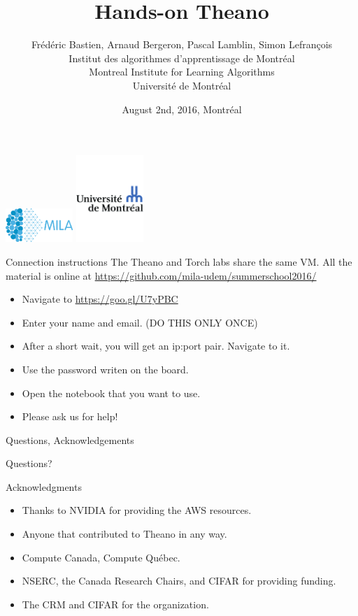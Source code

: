 \documentclass[a4paper,9pt]{beamer}
\title[Labs]{Hands-on Theano}
\author[MILA]{%
Frédéric Bastien, Arnaud Bergeron, Pascal Lamblin, Simon Lefrançois \\
Institut des algorithmes d'apprentissage de Montréal\\
Montreal Institute for Learning Algorithms\\
Université de Montréal}
\date{%
August 2nd, 2016, Montréal
}
\begin{document}
\begin{frame}[plain]
  \titlepage
  \includegraphics[width=1in]{MILA_official_2016.png}
  \hfill
  \includegraphics[width=1in]{UdeM_logo.pdf}
\end{frame}


\begin{frame}{Connection instructions}
  The Theano and Torch labs share the same VM.
  All the material is online at
  \url{https://github.com/mila-udem/summerschool2016/}

  \begin{itemize}
    \item Navigate to \url{https://goo.gl/U7yPBC}
    \item Enter your name and email. (DO THIS ONLY ONCE)
    \item After a short wait, you will get an ip:port pair. Navigate to it.
    \item Use the password writen on the board.
    \item Open the notebook that you want to use.
    \item Please ask us for help!
  \end{itemize}

\end{frame}


\begin{frame}{Questions, Acknowledgements}
\huge
\begin{center}
Questions?
\end{center}
\Large
Acknowledgments
\normalsize
\begin{itemize}
\item Thanks to NVIDIA for providing the AWS resources.
\item Anyone that contributed to Theano in any way.
\item Compute Canada, Compute Québec.
\item NSERC, the Canada Research Chairs, and CIFAR for providing funding.
\item The CRM and CIFAR for the organization.
\end{itemize}
\end{frame}
\end{document}
